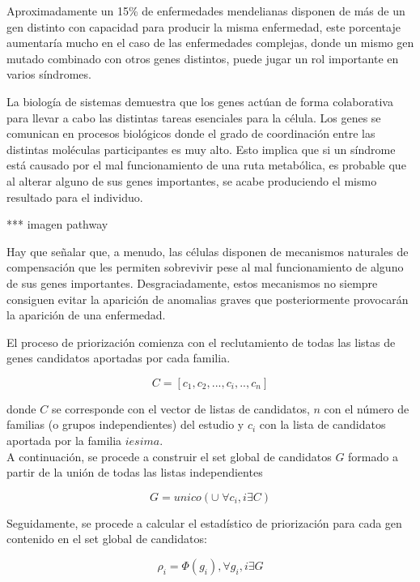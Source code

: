 \medskip
Aproximadamente un 15\% de enfermedades mendelianas disponen de más de un gen distinto con capacidad para producir la misma enfermedad, este porcentaje aumentaría mucho en el caso de las enfermedades complejas, donde un mismo gen mutado combinado con otros genes distintos, puede jugar un rol importante en varios síndromes. 

\medskip
La biología de sistemas demuestra que los genes actúan de forma colaborativa para llevar a cabo las distintas tareas esenciales para la célula. Los genes se comunican en procesos biológicos donde el grado de coordinación entre las distintas moléculas participantes es muy alto. Esto implica que si un síndrome está causado por el mal funcionamiento de una ruta metabólica, es probable que al alterar alguno de sus genes importantes, se acabe produciendo el mismo resultado para el individuo. 

*** imagen pathway

\medskip
Hay que señalar que, a menudo, las células disponen de mecanismos naturales de compensación que les permiten sobrevivir pese al mal funcionamiento de alguno de sus genes importantes. Desgraciadamente, estos mecanismos no siempre consiguen evitar la aparición de anomalias graves que posteriormente provocarán la aparición de una enfermedad.

\medskip
El proceso de priorización comienza con el reclutamiento de todas las listas de genes candidatos aportadas por cada familia.

\begin{equation}
  C = [c_1,c_2,...,c_i,..,c_n] 
\end{equation}

\medskip
donde $C$ se corresponde con el vector de listas de candidatos, $n$ con el número de familias (o grupos independientes) del estudio y $c_i$ con la lista de candidatos aportada por la familia $iesima$.
\\

A continuación, se procede a construir el set global de candidatos $G$ formado a partir de la unión de todas las listas independientes

\begin{equation}
G = unico( \cup \; \forall c_i, i \exists C )
\end{equation}

\medskip
Seguidamente, se procede a calcular el estadístico de priorización para cada gen contenido en el set global de candidatos:

\begin{equation}
\rho_i = \Phi(g_i), \forall g_i, i \exists G 
\end{equation}


